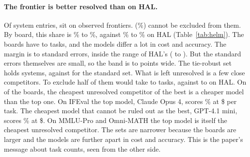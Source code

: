 \documentclass[11pt]{article}
\begin{document}
\begin{table}[t]
\centering\small
\resizebox{\textwidth}{!}{}
\caption{Frontier audit of the four HELM Capabilities boards at $\alpha=0.05$ with $B=4000$ task resamples. The columns are as in Table~\ref{tab:hal}. Cost is dollars per task. It comes from the recorded prompt and completion tokens at list prices read on 14 October 2026 (first-party prices for OpenAI and Anthropic, Together AI for open-weight models), under the rule in the text. As for HAL, a frontier here is a statement about these prices and this host. It is not advice on what to buy.}
\label{tab:helm}
\end{table}

\paragraph{The frontier is better resolved than on HAL.}
Of \NumHelmSystems{} system entries, \NumHelmObservedFrontier{} sit on observed frontiers. \NumHelmFrontierSet{} (\NumHelmFrontierSetPct\%) cannot be excluded from them. By board, this share is \NumHelmSetShareMinPct\% to \NumHelmSetShareMaxPct\%, against \NumHalSetShareMinPct\% to \NumHalSetShareMaxPct\% on HAL (Table~\ref{tab:helm}). The boards have \NumHelmTasksMin{} to \NumHelmTasksMax{} tasks, and the models differ a lot in cost and accuracy. The margin is \NumHelmMarginMin{} to \NumHelmMarginMax{} standard errors, inside the range of HAL's (\NumHalMarginSeMin{} to \NumHalMarginSeMax{}). But the standard errors themselves are small, so the band is \NumHelmBandWidthMin{} to \NumHelmBandWidthMax{} points wide. The tie-robust set holds \NumHelmTieRobustSet{} systems, against \NumHelmFrontierSet{} for the standard set. What is left unresolved is a few close competitors. To exclude half of them would take \NumHelmResTasksMedianMin{} to \NumHelmResTasksMedianMax{} tasks, against \NumResTasksMedianMin{} to \NumResTasksMedianMax{} on HAL. On \NumHelmBoardsCheaperBest{} of the \NumHelmBoards{} boards, the cheapest unresolved competitor of the best is a cheaper model than the top one. On IFEval the top model, Claude Opus 4, scores \NumHelmIfevalTopAcc\% at \$\NumHelmIfevalTopCost{} per task. The cheapest model that cannot be ruled out as the best, GPT-4.1 mini, scores \NumHelmIfevalCbAcc\% at \$\NumHelmIfevalCbCost{}. On MMLU-Pro and Omni-MATH the top model is itself the cheapest unresolved competitor. The sets are narrower because the boards are larger and the models are further apart in cost and accuracy. This is the paper's message about task counts, seen from the other side.
\end{document}
